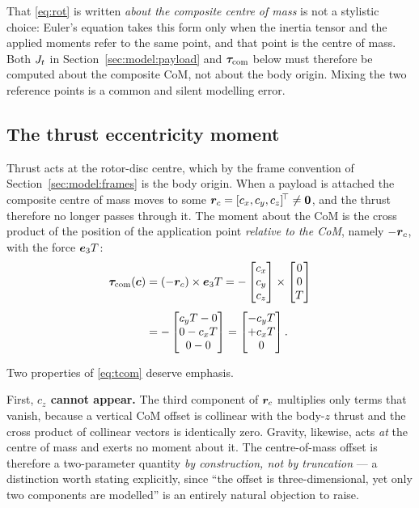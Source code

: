 That \eqref{eq:rot} is written \emph{about the composite centre of mass}
is not a stylistic choice: Euler's equation takes this form only when the
inertia tensor and the applied moments refer to the same point, and that
point is the centre of mass. Both $J_t$ in Section~\ref{sec:model:payload}
and $\bm{\tau}_{\mathrm{com}}$ below must therefore be computed about the composite CoM, not
about the body origin. Mixing the two reference points is a common and
silent modelling error.

\subsection{The thrust eccentricity moment}\label{sec:model:tcom}

Thrust acts at the rotor-disc centre, which by the frame convention of
Section~\ref{sec:model:frames} is the body origin. When a payload is
attached the composite centre of mass moves to some
$\bm{r}_c = [c_x, c_y, c_z]^{\!\top} \neq \bm{0}$, and the thrust therefore no
longer passes through it. The moment about the CoM is the cross product
of the position of the application point \emph{relative to the CoM},
namely $-\bm{r}_c$, with the force $\bm{e}_3 T$:
\begin{align}
\bm{\tau}_{\mathrm{com}}(\bm{c}) &= (-\bm{r}_c) \times \bm{e}_3 T
= -\begin{bmatrix} c_x \\ c_y \\ c_z \end{bmatrix}
\times \begin{bmatrix} 0 \\ 0 \\ T \end{bmatrix} \nonumber \\[4pt]
&= -\begin{bmatrix} c_y T - 0 \\ 0 - c_x T \\ 0 - 0 \end{bmatrix}
= \begin{bmatrix} -c_y T \\ +c_x T \\ 0 \end{bmatrix}.
\label{eq:tcom}
\end{align}

Two properties of \eqref{eq:tcom} deserve emphasis.

First, \textbf{$c_z$ cannot appear.} The third component of $\bm{r}_c$
multiplies only terms that vanish, because a vertical CoM offset is
collinear with the body-$z$ thrust and the cross product of collinear
vectors is identically zero. Gravity, likewise, acts \emph{at} the centre
of mass and exerts no moment about it. The centre-of-mass offset is
therefore a two-parameter quantity \emph{by construction, not by
truncation} --- a distinction worth stating explicitly, since ``the
offset is three-dimensional, yet only two components are modelled'' is an
entirely natural objection to raise.

